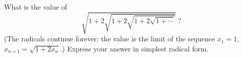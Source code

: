 What is the value of
\[
\sqrt{1+2\sqrt{1+2\sqrt{1+2\sqrt{1+\cdots}}}}\ ?
\]
(The radicals continue forever; the value is the limit of the sequence $x_1=1$, $x_{n+1}=\sqrt{1+2x_n}$.) Express your answer in simplest radical form.
